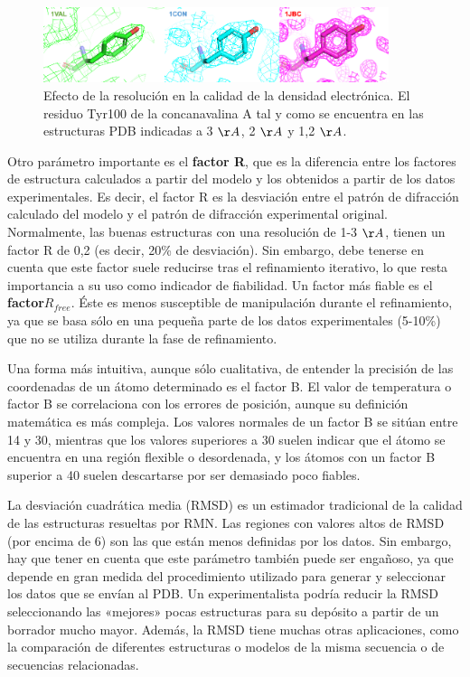 \begin{figure}[h]
\centering
\includegraphics[width = 0.9\textwidth]{figs/paste-C3031EBE.png}
\caption{Efecto de la resolución en la calidad de la densidad electrónica. El residuo Tyr100 de la concanavalina A tal y como se encuentra en las estructuras PDB indicadas a 3 $\AA$, 2 $\AA$ y 1,2 $\AA$. }
\end{figure}

Otro parámetro importante es el \textbf{factor R}, que es la diferencia entre los factores de estructura calculados a partir del modelo y los obtenidos a partir de los datos experimentales. Es decir, el factor R es la desviación entre el patrón de difracción calculado del modelo y el patrón de difracción experimental original. Normalmente, las buenas estructuras con una resolución de 1-3 $\AA$, tienen un factor R de 0,2 (es decir, 20\% de desviación). Sin embargo, debe tenerse en cuenta que este factor suele reducirse tras el refinamiento iterativo, lo que resta importancia a su uso como indicador de fiabilidad. Un factor más fiable es el \textbf{factor$ R_{free}$}. Éste es menos susceptible de manipulación durante el refinamiento, ya que se basa sólo en una pequeña parte de los datos experimentales (5-10\%) que no se utiliza durante la fase de refinamiento.

Una forma más intuitiva, aunque sólo cualitativa, de entender la precisión de las coordenadas de un átomo determinado es el factor B. El valor de temperatura o factor B se correlaciona con los errores de posición, aunque su definición matemática es más compleja. Los valores normales de un factor B se sitúan entre 14 y 30, mientras que los valores superiores a 30 suelen indicar que el átomo se encuentra en una región flexible o desordenada, y los átomos con un factor B superior a 40 suelen descartarse por ser demasiado poco fiables.

La desviación cuadrática media (RMSD) es un estimador tradicional de la calidad de las estructuras resueltas por RMN. Las regiones con valores altos de RMSD (por encima de 6) son las que están menos definidas por los datos. Sin embargo, hay que tener en cuenta que este parámetro también puede ser engañoso, ya que depende en gran medida del procedimiento utilizado para generar y seleccionar los datos que se envían al PDB. Un experimentalista podría reducir la RMSD seleccionando las «mejores» pocas estructuras para su depósito a partir de un borrador mucho mayor. Además, la RMSD tiene muchas otras aplicaciones, como la comparación de diferentes estructuras o modelos de la misma secuencia o de secuencias relacionadas.

